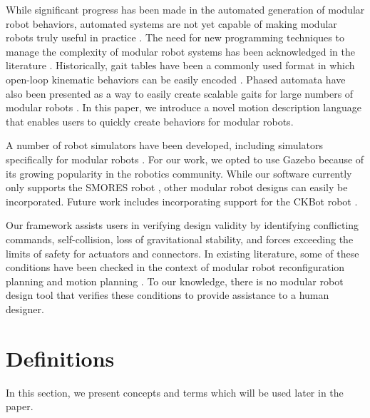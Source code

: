 \documentclass[graybox]{svmult}
\begin{document}
While significant progress has been made in the automated generation of modular
robot behaviors, automated systems are not yet capable of making modular robots
truly useful in practice \cite{yim2007modular}.  The need for new programming
techniques to manage the complexity of modular robot systems has been
acknowledged in the literature \cite{yim2000modular}. Historically, gait tables
have been a commonly used format in which open-loop kinematic behaviors can be
easily encoded \cite{yim1994locomotion}. Phased automata have also been
presented as a way to easily create scalable gaits for large numbers of modular
robots \cite{zhang2003phase}. In this paper, we introduce a novel motion
description language that enables users to quickly create behaviors for modular
robots.

A number of robot simulators have been developed, including simulators specifically for modular robots \cite{christensen2008unified}. For our work, we opted to use Gazebo \cite{koenig2004design} because of its growing popularity in the robotics community. While our software currently only supports the SMORES robot \cite{Davey2012}, other modular robot designs can easily be incorporated. Future work includes incorporating  support for the CKBot robot \cite{davey2012modlock}.

Our framework assists users in verifying design validity by identifying conflicting
commands, self-collision, loss of gravitational stability, and forces 
exceeding the limits of safety for actuators and connectors. In existing literature, some
of these
conditions have been checked in the context of modular robot reconfiguration
planning \cite{casal2001reconfiguration} and motion planning
\cite{yoshida2002self}. To our knowledge, there is no modular robot design tool
that verifies these conditions to provide assistance to a human designer.

\section{Definitions}
\label{sec:preliminaries}
In this section, we present concepts and terms which will be used later in the paper.
\end{document}
